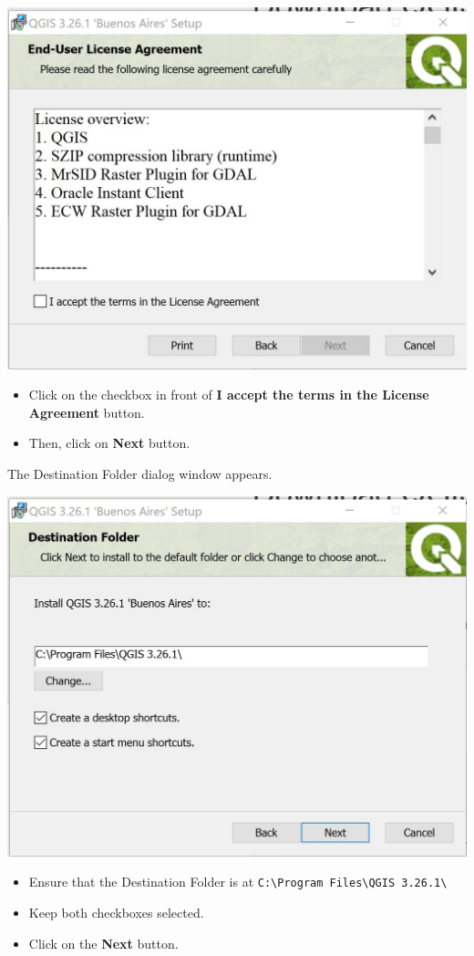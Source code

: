 \documentclass[
  letterpaper,
  DIV=11,
  numbers=noendperiod]{scrreprt}
\begin{document}
\includegraphics{./img/image6.jpg}

\begin{itemize}
\item
  Click on the checkbox in front of \textbf{I accept the terms in the
  License Agreement} button.
\item
  Then, click on \textbf{Next} button.
\end{itemize}

The Destination Folder dialog window appears.

\includegraphics{./img/image7.jpg}

\begin{itemize}
\item
  Ensure that the Destination Folder is at
  \texttt{C:\textbackslash{}Program\ Files\textbackslash{}QGIS\ 3.26.1\textbackslash{}}
\item
  Keep both checkboxes selected.
\item
  Click on the \textbf{Next} button.
\end{itemize}
\end{document}
